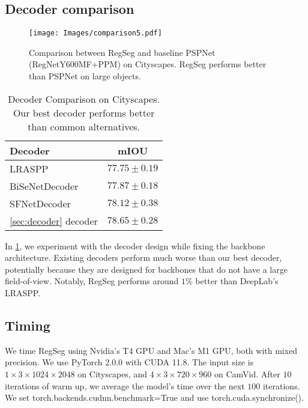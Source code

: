 \documentclass[10pt,twocolumn,letterpaper]{article}
\begin{document}
\subsection{Decoder comparison}

\begin{figure}
  \centering
    \texttt{[image: Images/comparison5.pdf]}
   \caption{Comparison between RegSeg and baseline PSPNet (RegNetY600MF+PPM) on Cityscapes. RegSeg performs better than PSPNet on large objects.}
   \label{fig:cityscapes_comparison}
\end{figure}

\label{sec:decoderComparison}
\begin{table}
  \centering
  \begin{tabular}{l|c}
    \toprule
    Decoder &mIOU\\
    \midrule
    LRASPP\cite{mobilenetv32019} & $77.75 \pm 0.19$\\
    BiSeNetDecoder\cite{bisenetv1}& $77.87\pm 0.18$\\
    SFNetDecoder\cite{sfnet} &$78.12 \pm 0.38$\\
    \cref{sec:decoder} decoder& $\mathbf{78.65} \pm 0.28$\\
    \bottomrule
  \end{tabular}
  \caption{Decoder Comparison on Cityscapes. Our best decoder performs better than common alternatives.}
  \label{tab:decoderComparison}
\end{table}





In \cref{tab:decoderComparison}, we experiment with the decoder design while fixing the backbone architecture. Existing decoders\cite{bisenetv1,sfnet,mobilenetv32019} perform much worse than our best decoder, potentially because they are designed for backbones that do not have a large field-of-view. Notably, RegSeg performs around $1\%$ better than DeepLab's LRASPP.













\subsection{Timing}
\label{sec:timing}


We time RegSeg using Nvidia's T4 GPU and Mac's M1 GPU, both with mixed precision. We use PyTorch 2.0.0\cite{pytorch} with CUDA 11.8. The input size is $1\times 3\times 1024\times 2048$ on Cityscapes, and $4\times 3\times 720\times 960$ on CamVid. After $10$ iterations of warm up, we average the model's time over the next $100$ iterations. We set torch.backends.cudnn.benchmark=True and use torch.cuda.synchronize().
\end{document}
